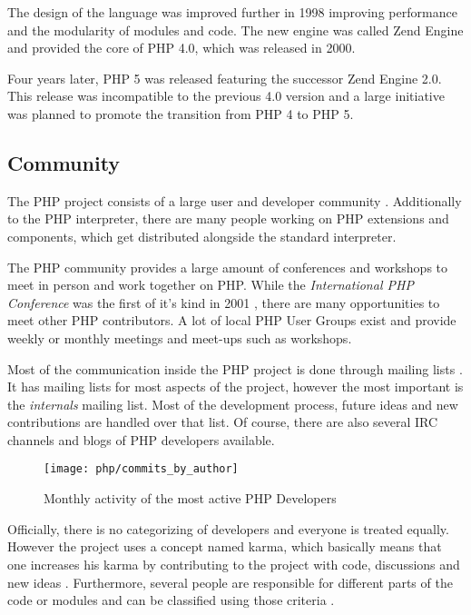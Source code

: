 The design of the language was improved further in 1998 improving performance
and the modularity of modules and code. The new engine was called Zend Engine
and provided the core of PHP 4.0, which was released in 2000.

Four years later, PHP 5 was released featuring the successor Zend Engine 2.0.
This release was incompatible to the previous 4.0 version and a large
initiative was planned to promote the transition from PHP 4 to PHP 5.


\subsection{Community} %

The PHP project consists of a large user and developer community
\cite{Magnusson2010}. Additionally to the PHP interpreter, there are many
people working on PHP extensions and components, which get distributed
alongside the standard interpreter.

The PHP community provides a large amount of conferences and workshops to meet
in person and work together on PHP. While the \emph{International PHP
Conference} was the first of it's kind in 2001 \cite{PHPConferences}, there are
many opportunities to meet other PHP contributors. A lot of local PHP User
Groups exist and provide weekly or monthly meetings and meet-ups such as
workshops.

Most of the communication inside the PHP project is done through mailing lists
\cite{Magnusson2010}. It has mailing lists for most aspects of the project,
however the most important is the \emph{internals} mailing list. Most of the
development process, future ideas and new contributions are handled over that
list. Of course, there are also several \ac{IRC} channels and blogs of PHP
developers available.

\begin{figure}[htbp]
  \centering
  \texttt{[image: php/commits\_by\_author]}
  \caption{Monthly activity of the most active PHP Developers}
\end{figure}

Officially, there is no categorizing of developers and everyone is treated
equally. However the project uses a concept named karma, which basically means
that one increases his karma by contributing to the project with code,
discussions and new ideas \cite{Magnusson2010}. Furthermore, several people are
responsible for different parts of the code or modules and can be classified
using those criteria \cite{PHPCredits}.

